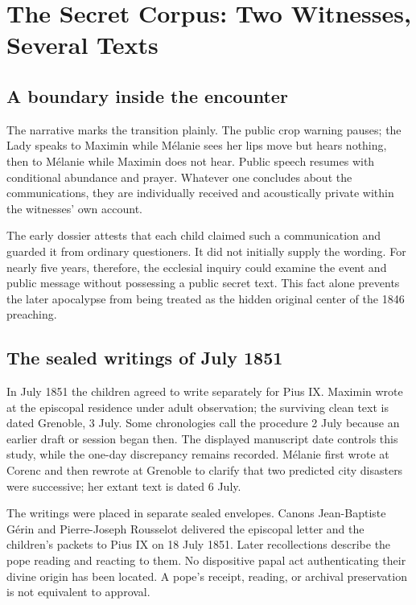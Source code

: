 \section{The Secret Corpus: Two Witnesses, Several Texts}

\subsection{A boundary inside the encounter}

The narrative marks the transition plainly. The public crop warning pauses; the Lady speaks to Maximin while Mélanie sees her lips move but hears nothing, then to Mélanie while Maximin does not hear. Public speech resumes with conditional abundance and prayer. Whatever one concludes about the communications, they are individually received and acoustically private within the witnesses' own account.

The early dossier attests that each child claimed such a communication and guarded it from ordinary questioners. It did not initially supply the wording. For nearly five years, therefore, the ecclesial inquiry could examine the event and public message without possessing a public secret text. This fact alone prevents the later apocalypse from being treated as the hidden original center of the 1846 preaching.

\subsection{The sealed writings of July 1851}

In July 1851 the children agreed to write separately for Pius IX. Maximin wrote at the episcopal residence under adult observation; the surviving clean text is dated Grenoble, 3 July. Some chronologies call the procedure 2 July because an earlier draft or session began then. The displayed manuscript date controls this study, while the one-day discrepancy remains recorded. Mélanie first wrote at Corenc and then rewrote at Grenoble to clarify that two predicted city disasters were successive; her extant text is dated 6 July.

The writings were placed in separate sealed envelopes. Canons Jean-Baptiste Gérin and Pierre-Joseph Rousselot delivered the episcopal letter and the children's packets to Pius IX on 18 July 1851. Later recollections describe the pope reading and reacting to them. No dispositive papal act authenticating their divine origin has been located. A pope's receipt, reading, or archival preservation is not equivalent to approval.


